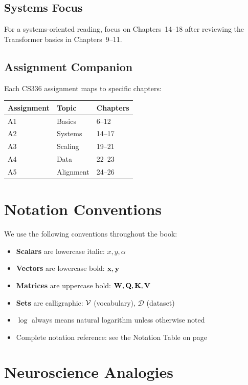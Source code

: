 \subsection{Systems Focus}
For a systems-oriented reading, focus on Chapters~14--18 after reviewing the Transformer basics in Chapters~9--11.

\subsection{Assignment Companion}
Each CS336 assignment maps to specific chapters:
\begin{center}
\begin{tabular}{lll}
\toprule
\textbf{Assignment} & \textbf{Topic} & \textbf{Chapters} \\
\midrule
A1 & Basics & 6--12 \\
A2 & Systems & 14--17 \\
A3 & Scaling & 19--21 \\
A4 & Data & 22--23 \\
A5 & Alignment & 24--26 \\
\bottomrule
\end{tabular}
\end{center}

\section{Notation Conventions}

We use the following conventions throughout the book:
\begin{itemize}
  \item \textbf{Scalars} are lowercase italic: $x, y, \alpha$
  \item \textbf{Vectors} are lowercase bold: $\mathbf{x}, \mathbf{y}$
  \item \textbf{Matrices} are uppercase bold: $\mathbf{W}, \mathbf{Q}, \mathbf{K}, \mathbf{V}$
  \item \textbf{Sets} are calligraphic: $\mathcal{V}$ (vocabulary), $\mathcal{D}$ (dataset)
  \item $\log$ always means natural logarithm unless otherwise noted
  \item Complete notation reference: see the Notation Table on page~\pageref{ch:00:sec:notation_table}
\end{itemize}

\section{Neuroscience Analogies}


